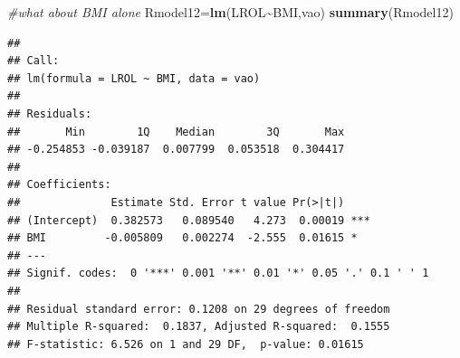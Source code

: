 \documentclass[
]{article}
\newenvironment{Shaded}{\begin{snugshade}}{\end{snugshade}}
\newcommand{\CommentTok}[1]{\textcolor[rgb]{0.56,0.35,0.01}{\textit{#1}}}
\newcommand{\FunctionTok}[1]{\textcolor[rgb]{0.13,0.29,0.53}{\textbf{#1}}}
\newcommand{\NormalTok}[1]{#1}
\newcommand{\OtherTok}[1]{\textcolor[rgb]{0.56,0.35,0.01}{#1}}
\newcommand{\SpecialCharTok}[1]{\textcolor[rgb]{0.81,0.36,0.00}{\textbf{#1}}}
\begin{document}
\begin{Shaded}
\begin{Highlighting}[]
\CommentTok{\#what about BMI alone}
\NormalTok{Rmodel12}\OtherTok{=}\FunctionTok{lm}\NormalTok{(LROL}\SpecialCharTok{\textasciitilde{}}\NormalTok{BMI,vao)}
\FunctionTok{summary}\NormalTok{(Rmodel12)}
\end{Highlighting}
\end{Shaded}

\begin{verbatim}
## 
## Call:
## lm(formula = LROL ~ BMI, data = vao)
## 
## Residuals:
##       Min        1Q    Median        3Q       Max 
## -0.254853 -0.039187  0.007799  0.053518  0.304417 
## 
## Coefficients:
##              Estimate Std. Error t value Pr(>|t|)    
## (Intercept)  0.382573   0.089540   4.273  0.00019 ***
## BMI         -0.005809   0.002274  -2.555  0.01615 *  
## ---
## Signif. codes:  0 '***' 0.001 '**' 0.01 '*' 0.05 '.' 0.1 ' ' 1
## 
## Residual standard error: 0.1208 on 29 degrees of freedom
## Multiple R-squared:  0.1837, Adjusted R-squared:  0.1555 
## F-statistic: 6.526 on 1 and 29 DF,  p-value: 0.01615
\end{verbatim}
\end{document}
